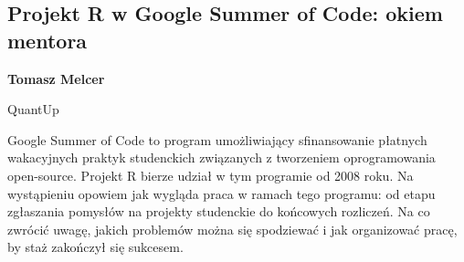 \documentclass[\main/boa.tex]{subfiles}
\begin{document}
\subsection{Projekt R w Google Summer of Code: okiem mentora}

\begin{minipage}{0.915\textwidth}
	\centering
  {\bf {} Tomasz Melcer}
\end{minipage}


\begin{affiliations}
\begin{minipage}{0.915\textwidth}
\centering
QuantUp \\[-2pt]
\end{minipage}
\end{affiliations}

\vskip 0.3cm

Google Summer of Code to program umożliwiający sfinansowanie płatnych wakacyjnych praktyk studenckich związanych z tworzeniem oprogramowania open-source. Projekt R bierze udział w tym programie od 2008 roku. Na wystąpieniu opowiem jak wygląda praca w ramach tego programu: od etapu zgłaszania pomysłów na projekty studenckie do końcowych rozliczeń. Na co zwrócić uwagę, jakich problemów można się spodziewać i jak organizować pracę, by staż zakończył się sukcesem. 
\end{document}
